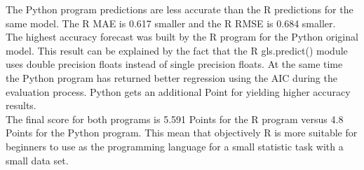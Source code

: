 \documentclass[
  twoside,
  11pt, a4paper,
  footinclude=true,
  headinclude=true,
  cleardoublepage=empty
]{scrreprt}
\begin{document}
    The Python program predictions are less accurate than the R predictions for the same model. The R MAE is 0.617 smaller and the R RMSE is 0.684 smaller.\\
    The highest accuracy forecast was built by the R program for the Python original model. This result can be explained by the fact that the R gls.predict() module uses double precision floats instead of single precision floats. At the same time the Python program has returned better regression using the AIC during the evaluation process. Python gets an additional Point for yielding higher accuracy results.\\
    The final score for both programs is 5.591 Points for the R program versus 4.8 Points for the Python program. This mean that objectively R is more suitable for beginners to use as the programming language for a small statistic task with a small data set.
    
\end{document}
